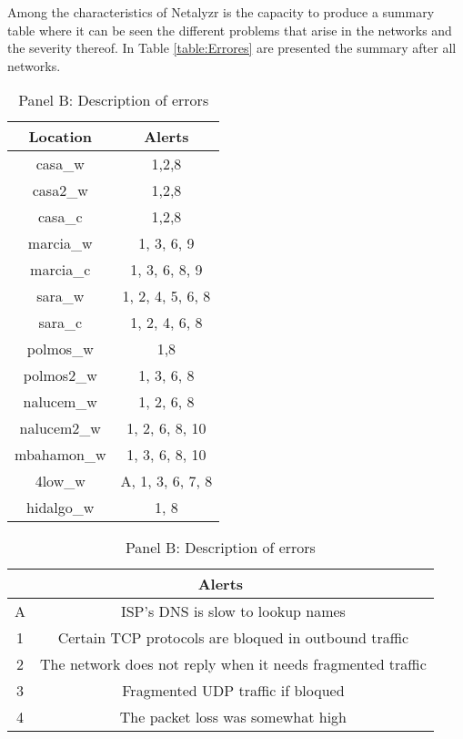 Among the characteristics of Netalyzr is the capacity to produce a summary
table where it can be seen the different problems that arise in the networks
and the severity thereof. In Table \ref{table:Errores} are presented the
summary after all networks.

\begin{table}
    \begin{subtable}{\linewidth}
    \centering
    \caption*{Panel A: Summary or errors}
    \begin{tabular}{|c||c|}
 \hline
Location		& Alerts            \\ \hline \hline
casa\_w			& 1,2,8             \\ \hline
casa2\_w		& 1,2,8             \\ \hline
casa\_c			& 1,2,8 			\\ \hline
marcia\_w		& 1, 3, 6, 9 		\\ \hline
marcia\_c		& 1, 3, 6, 8, 9 	\\ \hline
sara\_w			& 1, 2, 4, 5, 6, 8 	\\ \hline
sara\_c			& 1, 2, 4, 6, 8 	\\ \hline
polmos\_w		& 1,8 				\\ \hline
polmos2\_w		& 1, 3, 6, 8 		\\ \hline
nalucem\_w		& 1, 2, 6, 8 		\\ \hline
nalucem2\_w		& 1, 2, 6, 8, 10 	\\ \hline
mbahamon\_w		& 1, 3, 6, 8, 10 	\\ \hline
4low\_w			& A, 1, 3, 6, 7, 8 	\\ \hline
hidalgo\_w		& 1, 8 				\\ \hline
    \end{tabular}
    \end{subtable}
\bigskip
    \begin{subtable}{\linewidth}
    \centering
    \caption*{Panel B: Description of errors}
    \begin{tabular}{|c||c|}
 \hline
 \multicolumn{2}{|c|}{Alerts} \\ \hline \hline
A	& ISP's DNS is slow to lookup names								\\ \hline
1	& Certain TCP protocols are bloqued in outbound traffic 		\\ \hline
2	& The network does not reply when it needs fragmented traffic 	\\ \hline
3	& Fragmented UDP traffic if bloqued 							\\ \hline
4	& The packet loss was somewhat high 							\\ \hline

\end{tabular}
\end{subtable}
\end{table}

